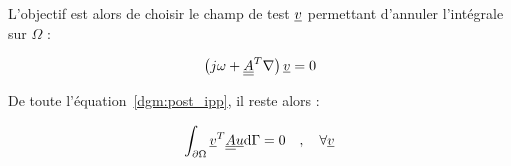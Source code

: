 L'objectif est alors de choisir le champ de test $\underline{v}$ permettant d'annuler l'intégrale sur $\Omega$ :

\begin{equation}
    \left(j\omega + \underline{\underline{A}}^T\nabla\right)\underline{v} = 0 \label{dgm:eq_v}
\end{equation}

De toute l'équation~\eqref{dgm:post_ipp}, il reste alors :

\begin{equation}
    \int_{\partial\Omega}\underline{v}^T\underline{\underline{A}}\underline{u}\mathrm{d}\Gamma = 0 \quad,\quad \forall\underline{v}\label{dgm:to_solve}
\end{equation}

